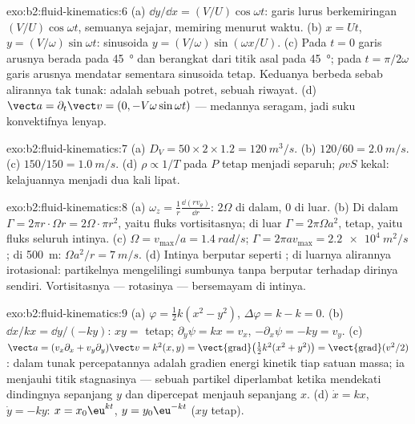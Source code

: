 \begin{solution}{exo:b2:fluid-kinematics:6}
(a) $\dd y/\dd x = (V/U)\cos\omega t$: garis lurus berkemiringan
$(V/U)\cos\omega t$, semuanya sejajar, memiring menurut waktu. (b) $x = Ut$, $y =
(V/\omega)\sin\omega t$: sinusoida $y = (V/\omega)\sin(\omega x/U)$. (c) Pada
$t = 0$ garis arusnya berada pada \qty{45}{\degree} dan  berangkat
dari titik asal pada \qty{45}{\degree}; pada $t = \pi/2\omega$ garis arusnya
mendatar sementara  sinusoida tetap. Keduanya berbeda sebab
alirannya tak tunak:  adalah sebuah potret,  sebuah riwayat.
(d) $\vect a = \partial_t\vect v = (0, -V\omega\sin\omega t)$ --- medannya
seragam, jadi suku konvektifnya lenyap.
\end{solution}

\begin{solution}{exo:b2:fluid-kinematics:7}
(a) $D_V = 50 \times 2 \times 1.2 = \qty{120}{m^3/s}$. (b) $120/60 = \qty{2.0}{m/s}$.
(c) $150/150 = \qty{1.0}{m/s}$. (d) $\rho \propto 1/T$ pada $P$ tetap menjadi separuh;
$\rho vS$ kekal: kelajuannya menjadi dua kali lipat.
\end{solution}

\begin{solution}{exo:b2:fluid-kinematics:8}
(a) $\omega_z = \frac1r\frac{\dd(rv_\theta)}{\dd r}$: $2\Omega$ di dalam, $0$
di luar. (b) Di dalam $\Gamma = 2\pi r\cdot\Omega r = 2\Omega\cdot\pi r^2$, yaitu fluks
vortisitasnya; di luar $\Gamma = 2\pi\Omega a^2$, tetap, yaitu fluks
seluruh intinya. (c) $\Omega = v_{\max}/a = \qty{1.4}{rad/s}$; $\Gamma = 2\pi av_{\max}
= \qty{2.2e4}{m^2/s}$; di \qty{500}{m}: $\Omega a^2/r = \qty{7}{m/s}$. (d)
Intinya berputar seperti ; di luarnya alirannya irotasional: partikelnya
mengelilingi sumbunya tanpa berputar terhadap dirinya sendiri. Vortisitasnya ---
rotasinya --- bersemayam di intinya.
\end{solution}

\begin{solution}{exo:b2:fluid-kinematics:9}
(a) $\varphi = \tfrac12k(x^2 - y^2)$, $\Delta\varphi = k - k = 0$. (b) $\dd x/
kx = \dd y/(-ky)$: $xy =$ tetap; $\partial_y\psi = kx = v_x$, $-\partial_x\psi =
-ky = v_y$. (c) $\vect a = (v_x\partial_x + v_y\partial_y)\vect v = k^2(x, y) =
\operatorname{\vect{grad}}\bigl(\tfrac12k^2(x^2 + y^2)\bigr) = \operatorname{\vect{grad}}
(v^2/2)$: dalam  tunak percepatannya adalah
gradien energi kinetik tiap satuan massa; ia menjauhi
titik stagnasinya --- sebuah partikel diperlambat ketika mendekati dindingnya
sepanjang $y$ dan dipercepat menjauh sepanjang $x$. (d) $\dot x = kx$, $\dot y = -ky$:
$x = x_0\eu^{kt}$, $y = y_0\eu^{-kt}$ ($xy$ tetap).
\end{solution}

